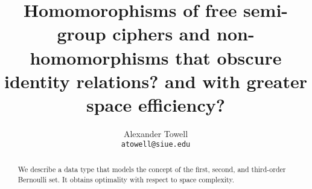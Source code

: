 \documentclass[final,11pt,hidelinks]{article}
\title
{
    Homomorophisms of free semi-group ciphers and non-homomorphisms that obscure identity relations? and with greater space efficiency?
}
\author
{
    Alexander Towell\\
    \texttt{atowell@siue.edu}
}
\date{}
\begin{document}
\maketitle
\begin{abstract}
We describe a data type that models the concept of the first, second, and third-order Bernoulli set.
It obtains optimality with respect to space complexity.
\end{abstract}


\tableofcontents
{}


%
%



\printglossary

\end{document}
